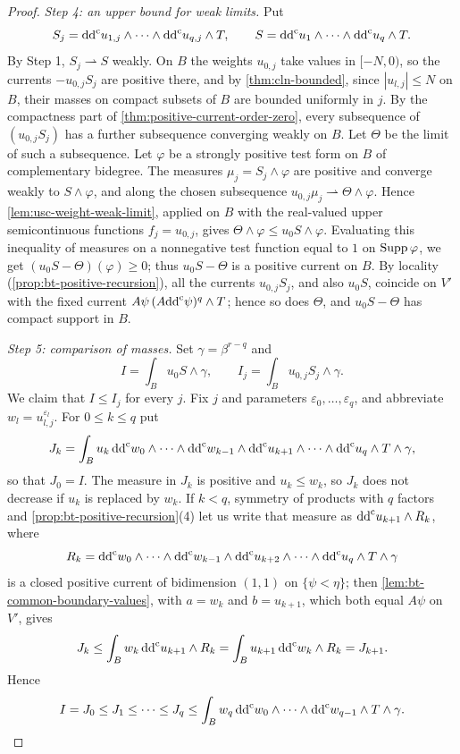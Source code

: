 \begin{proof}
\emph{Step 4: an upper bound for weak limits.} Put
\[
 S_j=\mathrm{dd}^{\mathrm{c}} u_{1,j}\wedge\cdots\wedge\mathrm{dd}^{\mathrm{c}} u_{q,j}\wedge T,\qquad
 S=\mathrm{dd}^{\mathrm{c}} u_1\wedge\cdots\wedge\mathrm{dd}^{\mathrm{c}} u_q\wedge T.
\]
By Step 1, $S_j\rightharpoonup S$ weakly. On $B$ the weights $u_{0,j}$ take values in $[-N,0)$, so the currents $-u_{0,j}S_j$ are positive there, and by \cref{thm:cln-bounded}, since $|u_{l,j}|\le N$ on $B$, their masses on compact subsets of $B$ are bounded uniformly in $j$. By the compactness part of \cref{thm:positive-current-order-zero}, every subsequence of $(u_{0,j}S_j)$ has a further subsequence converging weakly on $B$. Let $\Theta$ be the limit of such a subsequence. Let $\varphi$ be a strongly positive test form on $B$ of complementary bidegree. The measures $\mu_j=S_j\wedge\varphi$ are positive and converge weakly to $S\wedge\varphi$, and along the chosen subsequence $u_{0,j}\mu_j\rightharpoonup\Theta\wedge\varphi$. Hence \cref{lem:usc-weight-weak-limit}, applied on $B$ with the real-valued upper semicontinuous functions $f_j=u_{0,j}$, gives $\Theta\wedge\varphi\le u_0S\wedge\varphi$. Evaluating this inequality of measures on a nonnegative test function equal to $1$ on $\operatorname{Supp}\varphi$, we get $(u_0S-\Theta)(\varphi)\ge0$; thus $u_0S-\Theta$ is a positive current on $B$. By locality (\cref{prop:bt-positive-recursion}), all the currents $u_{0,j}S_j$, and also $u_0S$, coincide on $V'$ with the fixed current $A\psi\,(A\mathrm{dd}^{\mathrm{c}}\psi)^q\wedge T$; hence so does $\Theta$, and $u_0S-\Theta$ has compact support in $B$.

\emph{Step 5: comparison of masses.} Set $\gamma=\beta^{r-q}$ and
\[
 I=\int_Bu_0S\wedge\gamma,
 \qquad I_j=\int_Bu_{0,j}S_j\wedge\gamma.
\]
We claim that $I\le I_j$ for every $j$. Fix $j$ and parameters $\varepsilon_0,\ldots,\varepsilon_q$, and abbreviate $w_l=u^{\varepsilon_l}_{l,j}$. For $0\le k\le q$ put
\[
 J_k=\int_Bu_k\,\mathrm{dd}^{\mathrm{c}} w_0\wedge\cdots\wedge\mathrm{dd}^{\mathrm{c}} w_{k-1}\wedge\mathrm{dd}^{\mathrm{c}} u_{k+1}\wedge\cdots\wedge\mathrm{dd}^{\mathrm{c}} u_q\wedge T\wedge\gamma,
\]
so that $J_0=I$. The measure in $J_k$ is positive and $u_k\le w_k$, so $J_k$ does not decrease if $u_k$ is replaced by $w_k$. If $k<q$, symmetry of products with $q$ factors and \cref{prop:bt-positive-recursion}(4) let us write that measure as $\mathrm{dd}^{\mathrm{c}} u_{k+1}\wedge R_k$, where
\[
 R_k=\mathrm{dd}^{\mathrm{c}} w_0\wedge\cdots\wedge\mathrm{dd}^{\mathrm{c}} w_{k-1}\wedge\mathrm{dd}^{\mathrm{c}} u_{k+2}\wedge\cdots\wedge\mathrm{dd}^{\mathrm{c}} u_q\wedge T\wedge\gamma
\]
is a closed positive current of bidimension $(1,1)$ on $\{\psi<\eta\}$; then \cref{lem:bt-common-boundary-values}, with $a=w_k$ and $b=u_{k+1}$, which both equal $A\psi$ on $V'$, gives
\[
 J_k\le\int_Bw_k\,\mathrm{dd}^{\mathrm{c}} u_{k+1}\wedge R_k=\int_Bu_{k+1}\,\mathrm{dd}^{\mathrm{c}} w_k\wedge R_k=J_{k+1}.
\]
Hence
\[
 I=J_0\le J_1\le\cdots\le J_q\le\int_Bw_q\,\mathrm{dd}^{\mathrm{c}} w_0\wedge\cdots\wedge\mathrm{dd}^{\mathrm{c}} w_{q-1}\wedge T\wedge\gamma.
\]


\end{proof}
